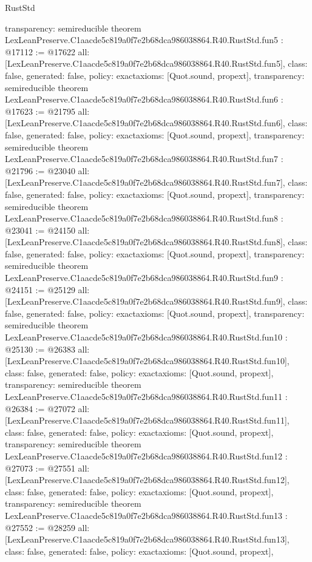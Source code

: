 \begin{lexlean}{RustStd}
\begin{coremodule}
{  transparency: semireducible
}
theorem LexLeanPreserve.C1aacde5c819a0f7e2b68dca986038864.R40.RustStd.fun5 : @17112 := @17622 {
  all: [LexLeanPreserve.C1aacde5c819a0f7e2b68dca986038864.R40.RustStd.fun5],
  class: false,
  generated: false,
  policy: exact{axioms: [Quot.sound, propext]},
  transparency: semireducible
}
theorem LexLeanPreserve.C1aacde5c819a0f7e2b68dca986038864.R40.RustStd.fun6 : @17623 := @21795 {
  all: [LexLeanPreserve.C1aacde5c819a0f7e2b68dca986038864.R40.RustStd.fun6],
  class: false,
  generated: false,
  policy: exact{axioms: [Quot.sound, propext]},
  transparency: semireducible
}
theorem LexLeanPreserve.C1aacde5c819a0f7e2b68dca986038864.R40.RustStd.fun7 : @21796 := @23040 {
  all: [LexLeanPreserve.C1aacde5c819a0f7e2b68dca986038864.R40.RustStd.fun7],
  class: false,
  generated: false,
  policy: exact{axioms: [Quot.sound, propext]},
  transparency: semireducible
}
theorem LexLeanPreserve.C1aacde5c819a0f7e2b68dca986038864.R40.RustStd.fun8 : @23041 := @24150 {
  all: [LexLeanPreserve.C1aacde5c819a0f7e2b68dca986038864.R40.RustStd.fun8],
  class: false,
  generated: false,
  policy: exact{axioms: [Quot.sound, propext]},
  transparency: semireducible
}
theorem LexLeanPreserve.C1aacde5c819a0f7e2b68dca986038864.R40.RustStd.fun9 : @24151 := @25129 {
  all: [LexLeanPreserve.C1aacde5c819a0f7e2b68dca986038864.R40.RustStd.fun9],
  class: false,
  generated: false,
  policy: exact{axioms: [Quot.sound, propext]},
  transparency: semireducible
}
theorem LexLeanPreserve.C1aacde5c819a0f7e2b68dca986038864.R40.RustStd.fun10 : @25130 := @26383 {
  all: [LexLeanPreserve.C1aacde5c819a0f7e2b68dca986038864.R40.RustStd.fun10],
  class: false,
  generated: false,
  policy: exact{axioms: [Quot.sound, propext]},
  transparency: semireducible
}
theorem LexLeanPreserve.C1aacde5c819a0f7e2b68dca986038864.R40.RustStd.fun11 : @26384 := @27072 {
  all: [LexLeanPreserve.C1aacde5c819a0f7e2b68dca986038864.R40.RustStd.fun11],
  class: false,
  generated: false,
  policy: exact{axioms: [Quot.sound, propext]},
  transparency: semireducible
}
theorem LexLeanPreserve.C1aacde5c819a0f7e2b68dca986038864.R40.RustStd.fun12 : @27073 := @27551 {
  all: [LexLeanPreserve.C1aacde5c819a0f7e2b68dca986038864.R40.RustStd.fun12],
  class: false,
  generated: false,
  policy: exact{axioms: [Quot.sound, propext]},
  transparency: semireducible
}
theorem LexLeanPreserve.C1aacde5c819a0f7e2b68dca986038864.R40.RustStd.fun13 : @27552 := @28259 {
  all: [LexLeanPreserve.C1aacde5c819a0f7e2b68dca986038864.R40.RustStd.fun13],
  class: false,
  generated: false,
  policy: exact{axioms: [Quot.sound, propext]},
}
\end{coremodule}
\end{lexlean}
